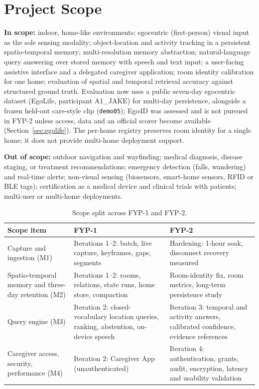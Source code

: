 \section{Project Scope}
\textbf{In scope:} indoor, home-like environments; egocentric (first-person)
visual input as the sole sensing modality; object-location and activity
tracking in a persistent spatio-temporal memory; multi-resolution memory
abstraction; natural-language query answering over stored memory with speech
and text input; a user-facing assistive interface and a delegated caregiver
application; room identity calibration for one home; evaluation of spatial and temporal retrieval accuracy against structured ground truth. Evaluation now uses a public seven-day egocentric dataset (EgoLife, participant A1\_JAKE) for multi-day persistence, alongside a frozen held-out care-style clip (\texttt{demo05}); Ego4D was assessed and is not pursued in FYP-2 unless access, data and an official scorer become available (Section~\ref{sec:egolife}). The per-home registry preserves room identity for a single home; it does not provide multi-home deployment support.

\textbf{Out of scope:} outdoor navigation and wayfinding; medical diagnosis,
disease staging, or treatment recommendations; emergency detection (falls,
wandering) and real-time alerts; non-visual sensing (biosensors, smart-home
sensors, RFID or BLE tags); certification as a medical device and clinical
trials with patients; multi-user or multi-home deployments.

\begin{table}[H]
\centering\small
\caption{Scope split across FYP-1 and FYP-2.}
\label{tab:scope}
\begin{tabularx}{\textwidth}{@{}L{3.6cm} Y Y@{}}
\toprule
{}\textbf{Scope item} & \textbf{FYP-1} & \textbf{FYP-2}\\
\midrule
Capture and ingestion (M1) & Iterations 1--2: batch, live capture, keyframes, gaps, segments & Hardening: 1-hour soak, disconnect recovery measured\\
Spatio-temporal memory and three-day retention (M2) & Iterations 1--2: rooms, relations, state runs, home store, compaction & Room-identity fix, room metrics, long-term persistence study\\
Query engine (M3) & Iteration 2: closed-vocabulary location queries, ranking, abstention, on-device speech & Iteration 3: temporal and activity answers, calibrated confidence, evidence references\\
Caregiver access, security, performance (M4) & Iteration 2: Caregiver App (unauthenticated) & Iteration 4: authentication, grants, audit, encryption, latency and usability validation\\
\bottomrule
\end{tabularx}
\end{table}

